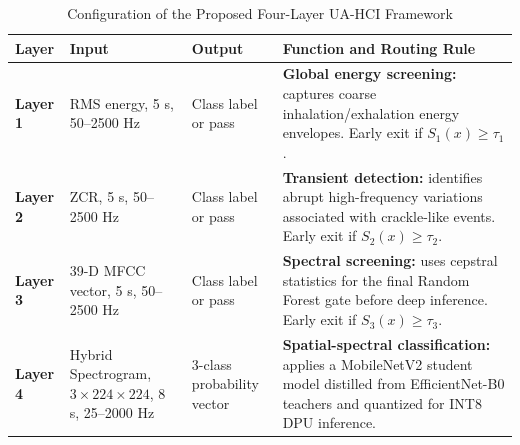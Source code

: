 \begin{table}[htbp]
    \centering
    \caption{Configuration of the Proposed Four-Layer UA-HCI Framework}
    \label{tab:framework_config}
    \small
    \setlength{\tabcolsep}{3pt}
    \renewcommand{\arraystretch}{1.18}
    \begin{tabularx}{\textwidth}{@{}p{1.25cm}p{3.2cm}p{2.5cm}X@{}}
        \toprule
        \textbf{Layer} & \textbf{Input} & \textbf{Output} & \textbf{Function and Routing Rule} \\
        \midrule
        \textbf{Layer 1} & RMS energy, 5 s, 50--2500 Hz & Class label or pass & \textbf{Global energy screening:} captures coarse inhalation/exhalation energy envelopes. Early exit if $S_1(x) \ge \tau_1$. \\
        \textbf{Layer 2} & ZCR, 5 s, 50--2500 Hz & Class label or pass & \textbf{Transient detection:} identifies abrupt high-frequency variations associated with crackle-like events. Early exit if $S_2(x) \ge \tau_2$. \\
        \textbf{Layer 3} & 39-D MFCC vector, 5 s, 50--2500 Hz & Class label or pass & \textbf{Spectral screening:} uses cepstral statistics for the final Random Forest gate before deep inference. Early exit if $S_3(x) \ge \tau_3$. \\
        \textbf{Layer 4} & Hybrid Spectrogram, $3 \times 224 \times 224$, 8 s, 25--2000 Hz & 3-class probability vector & \textbf{Spatial-spectral classification:} applies a MobileNetV2 student model distilled from EfficientNet-B0 teachers and quantized for INT8 DPU inference. \\
        \bottomrule
    \end{tabularx}
\end{table}
